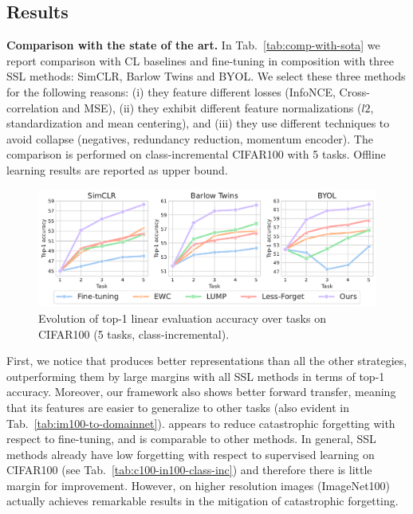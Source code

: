 \subsection{Results}\vspace{-3mm}
\noindent\textbf{Comparison with the state of the art.} In Tab.~\ref{tab:comp-with-sota} we report comparison with CL baselines and fine-tuning in composition with three SSL methods: SimCLR, Barlow Twins and BYOL. We select these three methods for the following reasons: (i) they feature different losses (InfoNCE, Cross-correlation and MSE), (ii) they exhibit different feature normalizations ($l2$, standardization and mean centering), and (iii) they use different techniques to avoid collapse (negatives, redundancy reduction, momentum encoder). The comparison is performed on class-incremental CIFAR100 with 5 tasks. Offline learning results are reported as upper bound. 

\begin{figure}[t]
    \centering
    \includegraphics[width=\columnwidth]{figures/lineplot.pdf}
    \vspace{-22pt}
    \caption{Evolution of top-1 linear evaluation accuracy over tasks on CIFAR100 (5 tasks, class-incremental).}
    \label{fig:lineplot}
    \vspace{-13pt}
\end{figure}

First, we notice that \name{} produces better representations than all the other strategies, outperforming them by large margins with all SSL methods in terms of top-1 accuracy. Moreover, our framework also shows better forward transfer, meaning that its features are easier to generalize to other tasks (also evident in Tab.~\ref{tab:im100-to-domainnet}). \name{} appears to reduce catastrophic forgetting with respect to fine-tuning, and is comparable to other methods. 
In general, SSL methods already have low forgetting with respect to supervised learning on CIFAR100 (see Tab.~\ref{tab:c100-in100-class-inc}) and therefore there is little margin for improvement. However, on higher resolution images (ImageNet100) \name{} actually achieves remarkable results in the mitigation of catastrophic forgetting.

